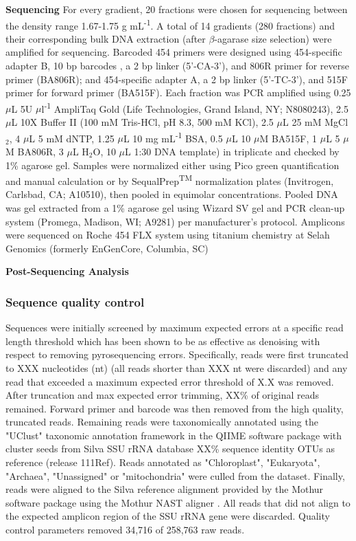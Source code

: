 \textbf{Sequencing}  For every gradient, 20 fractions were chosen for sequencing between the density range 1.67-1.75 g mL\textsuperscript{-1}. A total of 14 gradients (280 fractions) and their corresponding bulk DNA extraction (after $\beta$-agarase size selection) were amplified for sequencing. Barcoded 454 primers were designed using 454-specific adapter B, 10 bp barcodes \cite{Hamady_2008}, a 2 bp linker (5'-CA-3'), and 806R primer for reverse primer (BA806R); and 454-specific adapter A, a 2 bp linker (5'-TC-3'), and 515F primer for forward primer (BA515F). Each fraction was PCR amplified using 0.25 $\mu$L 5U $\mu$l\textsuperscript{-1} AmpliTaq Gold (Life Technologies, Grand Island, NY; N8080243), 2.5 $\mu$L 10X Buffer II (100 mM Tris-HCl, pH 8.3, 500 mM KCl), 2.5 $\mu$L 25 mM MgCl$_{2}$, 4 $\mu$L 5 mM dNTP, 1.25 $\mu$L 10 mg mL\textsuperscript{-1} BSA, 0.5 $\mu$L 10 $\mu$M BA515F, 1 $\mu$L 5 $\mu$M BA806R, 3 $\mu$L H$_{2}$O, 10 $\mu$L 1:30 DNA template) in triplicate and checked by 1\% agarose gel. Samples were normalized either using Pico green quantification and manual calculation or by SequalPrep\textsuperscript{TM} normalization plates (Invitrogen, Carlsbad, CA; A10510), then pooled in equimolar concentrations. Pooled DNA was gel extracted from a 1\% agarose gel using Wizard SV gel and PCR clean-up system (Promega, Madison, WI; A9281) per manufacturer's protocol.  Amplicons were sequenced on Roche 454 FLX system using titanium chemistry at Selah Genomics (formerly EnGenCore, Columbia, SC)    

\textbf{Post-Sequencing Analysis}
\subsubsection{Sequence quality control}
Sequences were initially screened by maximum expected errors at a specific read
length threshold \citep{23955772} which has been shown to be as effective as
denoising with respect to removing pyrosequencing errors. Specifically, reads
were first truncated to XXX nucleotides (nt) (all reads shorter than XXX nt
were discarded) and any read that exceeded a maximum expected error threshold
of X.X was removed. After truncation and max expected error trimming, XX\% of
original reads remained. Forward primer and barcode was then removed from the
high quality, truncated reads.  Remaining reads were taxonomically annotated
using the "UClust" taxonomic annotation framework in the QIIME software package
\citep{20383131,20709691} with cluster seeds from Silva SSU rRNA database
\citep{17947321} XX\% sequence identity OTUs as reference (release 111Ref).
Reads annotated as "Chloroplast", "Eukaryota", "Archaea", "Unassigned" or
"mitochondria" were culled from the dataset. Finally, reads were aligned to the
Silva reference alignment provided by the Mothur software package
\citep{19801464} using the Mothur NAST aligner \citep{16845035}. All reads that
did not align to the expected amplicon region of the SSU rRNA gene were
discarded. Quality control parameters removed 34,716 of 258,763 raw reads.


